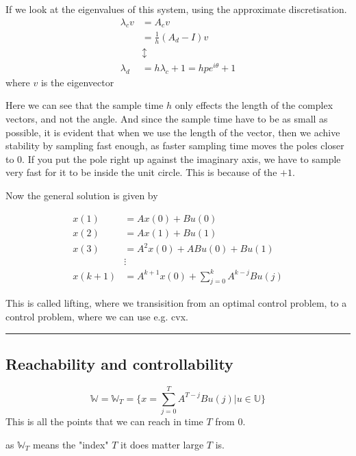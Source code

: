 \documentclass[a4paper]{article}
\begin{document}
If we look at the eigenvalues of this system, using the approximate discretisation.
\begin{align}
\lambda_c v &= A_c v\\  
			&= \frac{1}{h}(A_d - I)v \\
			&\updownarrow \\
			\lambda_d &= h \lambda_c + 1 = h p e^{i \theta} +1
\end{align}
where $ v $ is the eigenvector

Here we can see that the sample time $ h $ only effects the length of the complex vectors, and not the angle. 
And since the sample time have to be as small as possible, it is evident that when we use the length of the vector, then we achive stability by sampling fast enough, as faster sampling time moves the poles closer to $ 0 $. If you put the pole right up against the imaginary axis, we have to sample very fast for it to be inside the unit circle. This is because of the $ +1 $.

Now the general solution is given by

\begin{align}
	x(1) &= A x(0) + B u(0) \label{eq7}\\
x(2) &= A x(1) + B u(1) \\
x(3) &= A^{2} x(0) + A B u(0) + B u(1) \\
	 &\vdots \\
x(k+1) &= A^{k+1} x(0) + \sum_{j = 0}^{k}{A^{k-j} B u(j)} \label{eq8}
\end{align}

This is called lifting, where we transisition from an optimal control problem, to a control problem, where we can use e.g. cvx.

\vspace{5pt}
\hrule
\vspace{5pt}
\subsection{Reachability and controllability}
\begin{equation}
	\mathbb{W} = \mathbb{W}_T = \{x = \sum_{j = 0}^{T}{A^{T - j} B u(j)} | u \in \mathbb{U} \}
\end{equation}
This is all the points that we can reach in time $ T $ from  $ 0 $.

as $ \mathbb{W}_T $ means the "index"  $ T $ it does matter large $ T $ is. 


\centering
{}
\end{document}

